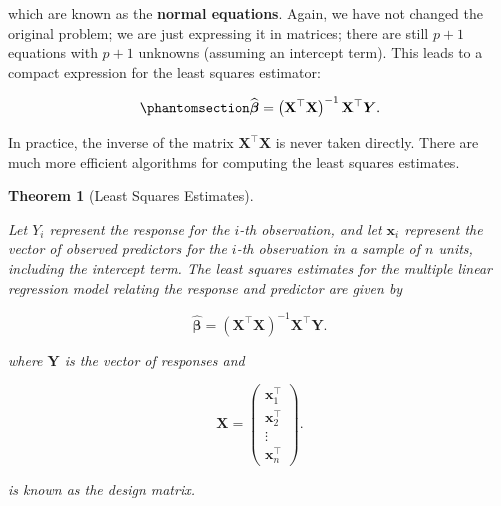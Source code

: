 \documentclass[
  letterpaper,
  DIV=11,
  numbers=noendperiod]{scrreprt}
\theoremstyle{definition}
\theoremstyle{plain}
\newtheorem{theorem}{Theorem}[chapter]
\theoremstyle{definition}
\theoremstyle{remark}
\begin{document}
which are known as the \textbf{normal equations}. Again, we have not
changed the original problem; we are just expressing it in matrices;
there are still \(p + 1\) equations with \(p + 1\) unknowns (assuming an
intercept term). This leads to a compact expression for the least
squares estimator:

\begin{equation}\phantomsection\label{eq-reg-lse}{\widehat{\boldsymbol{\beta}} = \left(\mathbf{X}^\top \mathbf{X}\right)^{-1} \mathbf{X}^\top \boldsymbol{Y}.}\end{equation}

\begin{tcolorbox}[enhanced jigsaw, rightrule=.15mm, leftrule=.75mm, opacityback=0, coltitle=black, bottomrule=.15mm, opacitybacktitle=0.6, left=2mm, colframe=quarto-callout-warning-color-frame, breakable, colback=white, arc=.35mm, toprule=.15mm, toptitle=1mm, bottomtitle=1mm, title=\textcolor{quarto-callout-warning-color}{\faExclamationTriangle}\hspace{0.5em}{Warning}, titlerule=0mm, colbacktitle=quarto-callout-warning-color!10!white]

In practice, the inverse of the matrix \(\mathbf{X}^\top \mathbf{X}\) is
never taken directly. There are much more efficient algorithms for
computing the least squares estimates.

\end{tcolorbox}

\begin{theorem}[Least Squares
Estimates]\protect\hypertarget{thm-least-squares-mlr}{}\label{thm-least-squares-mlr}

Let \(Y_i\) represent the response for the \(i\)-th observation, and let
\(\mathbf{x}_i\) represent the vector of observed predictors for the
\(i\)-th observation in a sample of \(n\) units, including the intercept
term. The least squares estimates for the multiple linear regression
model relating the response and predictor are given by

\[\widehat{\boldsymbol{\beta}} = \left(\mathbf{X}^\top \mathbf{X}\right)^{-1} \mathbf{X}^\top \boldsymbol{Y}.\]

where \(\mathbf{Y}\) is the vector of responses and

\[\mathbf{X} = \begin{pmatrix} \mathbf{x}_1^\top \\ \mathbf{x}_2^\top \\ \vdots \\ \mathbf{x}_n^\top \end{pmatrix}.\]

is known as the design matrix.

\end{theorem}
\end{document}
